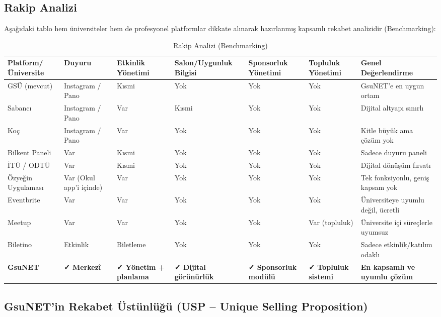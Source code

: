 \documentclass[a4paper,12pt]{report}
\begin{document}
\subsection{Rakip Analizi}

Aşağıdaki tablo hem üniversiteler hem de profesyonel platformlar dikkate alınarak hazırlanmış kapsamlı rekabet analizidir (Benchmarking):

\begin{table}[h]
\centering
\tiny
\begin{tabular}{|p{2cm}|p{1.3cm}|p{2cm}|p{1.8cm}|p{2cm}|p{1.8cm}|p{2.5cm}|}
\hline
\textbf{Platform/Üniversite} & \textbf{Duyuru} & \textbf{Etkinlik Yönetimi} & \textbf{Salon/Uygunluk Bilgisi} & \textbf{Sponsorluk Yönetimi} & \textbf{Topluluk Yönetimi} & \textbf{Genel Değerlendirme} \\
\hline
GSÜ (mevcut) & Instagram / Pano & Kısmi & Yok & Yok & Yok & GsuNET'e en uygun ortam \\
\hline
Sabancı & Instagram / Pano & Var & Kısmi & Yok & Yok & Dijital altyapı sınırlı \\
\hline
Koç & Instagram / Pano & Var & Yok & Yok & Yok & Kitle büyük ama çözüm yok \\
\hline
Bilkent Paneli & Var & Kısmi & Yok & Yok & Yok & Sadece duyuru paneli \\
\hline
İTÜ / ODTÜ & Var & Kısmi & Yok & Yok & Yok & Dijital dönüşüm fırsatı \\
\hline
Özyeğin Uygulaması & Var (Okul app'i içinde) & Var & Yok & Yok & Yok & Tek fonksiyonlu, geniş kapsam yok \\
\hline
Eventbrite & Var & Var & Yok & Yok & Yok & Üniversiteye uyumlu değil, ücretli \\
\hline
Meetup & Var & Var & Yok & Yok & Var (topluluk) & Üniversite içi süreçlerle uyumsuz \\
\hline
Biletino & Etkinlik & Biletleme & Yok & Yok & Yok & Sadece etkinlik/katılım odaklı \\
\hline
\textbf{GsuNET} & \textbf{✓ Merkezî} & \textbf{✓ Yönetim + planlama} & \textbf{✓ Dijital görünürlük} & \textbf{✓ Sponsorluk modülü} & \textbf{✓ Topluluk sistemi} & \textbf{En kapsamlı ve uyumlu çözüm} \\
\hline
\end{tabular}
\caption{Rakip Analizi (Benchmarking)}
\end{table}

\subsection{GsuNET'in Rekabet Üstünlüğü (USP – Unique Selling Proposition)}
\end{document}
